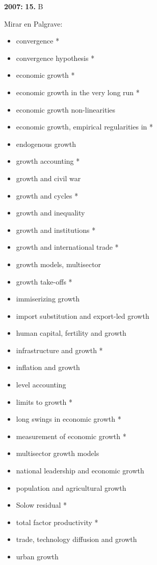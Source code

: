 \documentclass{nuevotema}
\begin{document}
\textbf{2007:} \textbf{15.} B

\bibliografia

Mirar en Palgrave:
\begin{itemize}
    \item convergence *
    \item convergence hypothesis *
    \item economic growth *
    \item economic growth in the very long run *
    \item economic growth non-linearities
    \item economic growth, empirical regularities in *
    \item endogenous growth
    \item growth accounting *
    \item growth and civil war 
    \item growth and cycles *
    \item growth and inequality 
    \item growth and institutions *
    \item growth and international trade *
    \item growth models, multisector
    \item growth take-offs *
    \item immiserizing growth
    \item import substitution and export-led growth
    \item human capital, fertility and growth
    \item infrastructure and growth *
    \item inflation and growth
    \item level accounting
    \item limits to growth *
    \item long swings in economic growth *
    \item measurement of economic growth *
    \item multisector growth models 
    \item national leadership and economic growth
    \item population and agricultural growth
    \item Solow residual *
    \item total factor productivity *
    \item trade, technology diffusion and growth
    \item urban growth
\end{itemize}
\end{document}
